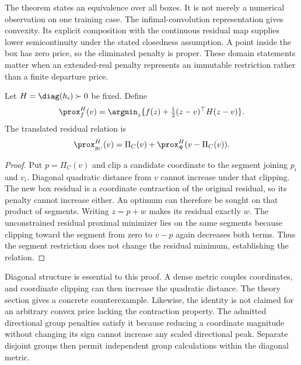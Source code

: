 The theorem states an equivalence over all boxes. It is not merely a
numerical observation on one training case. The infimal-convolution
representation gives convexity. Its explicit composition with the
continuous residual map supplies lower semicontinuity under the stated
closedness assumption. A point inside the box has zero price, so the
eliminated penalty is proper. These domain statements matter when an
extended-real penalty represents an immutable restriction rather than
a finite departure price.

Let $H=\diag(h_i)\succ0$ be fixed. Define
\begin{equation}\label{eq:paper-metric-prox}
 \prox_f^H(v)=\argmin_z\{f(z)+\tfrac12(z-v)^\top H(z-v)\}.
\end{equation}
The translated residual relation is
\begin{equation}\label{eq:paper-translated-prox}
 \prox_{g_C}^H(v)=\Pi_C(v)+\prox_{\Psi}^H(v-\Pi_C(v)).
\end{equation}
\begin{proof}
Put $p=\Pi_C(v)$ and clip a candidate coordinate to the
segment joining $p_i$ and $v_i$. Diagonal quadratic distance from $v$
cannot increase under that clipping. The new box residual is a
coordinate contraction of the original residual, so its penalty cannot
increase either. An optimum can therefore be sought on that product
of segments. Writing $z=p+w$ makes its residual exactly $w$. The
unconstrained residual proximal minimizer lies on the same segments
because clipping toward the segment from zero to $v-p$ again decreases
both terms. Thus the segment restriction does not change the residual
minimum, establishing the relation.
\end{proof}

Diagonal structure is essential to this proof. A dense metric couples
coordinates, and coordinate clipping can then increase the quadratic
distance. The theory section gives a concrete counterexample. Likewise,
the identity is not claimed for an arbitrary convex price lacking the
contraction property. The admitted directional group penalties satisfy
it because reducing a coordinate magnitude without changing its sign
cannot increase any scaled directional peak. Separate disjoint groups
then permit independent group calculations within the diagonal metric.

